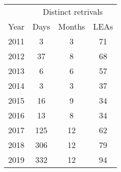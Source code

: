 \begin{tabular}{lccc}
\toprule
\toprule
 & \multicolumn{3}{c}{Distinct retrivals} \\
 Year & Days & Months & LEAs \\
\midrule 
2011 & 3 & 3 & 71 \\
2012 & 37 & 8 & 68 \\
2013 & 6 & 6 & 57 \\
2014 & 3 & 3 & 37 \\
2015 & 16 & 9 & 34 \\
2016 & 13 & 8 & 34 \\
2017 & 125 & 12 & 62 \\
2018 & 306 & 12 & 79 \\
2019 & 332 & 12 & 94 \\
\bottomrule
\bottomrule
\end{tabular}